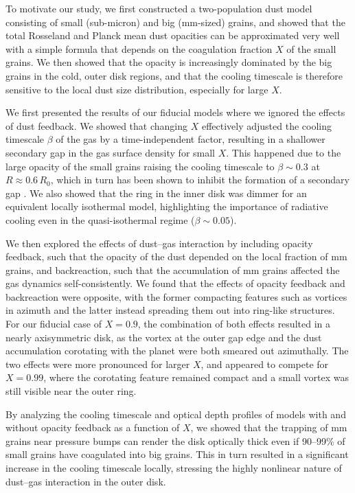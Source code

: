 \documentclass[fleqn,usenatbib,useAMS]{mnras}
\begin{document}
To motivate our study, we first constructed a two-population dust model consisting of small (sub-micron) and big (mm-sized) grains, and showed that the total Rosseland and Planck mean dust opacities can be approximated very well with a simple formula that depends on the coagulation fraction $X$ of the small grains. We then showed that the opacity is increasingly dominated by the big grains in the cold, outer disk regions, and that the cooling timescale is therefore sensitive to the local dust size distribution, especially for large $X$.

We first presented the results of our fiducial models where we ignored the effects of dust feedback. We showed that changing $X$ effectively adjusted the cooling timescale $\beta$ of the gas by a time-independent factor, resulting in a shallower secondary gap in the gas surface density for small $X$. This happened due to the large opacity of the small grains raising the cooling timescale to $\beta\sim0.3$ at $R\approx0.6\,R_0$, which in turn has been shown to inhibit the formation of a secondary gap \citep{miranda-rafikov-2020a,ziampras-etal-2020b,zhang-zhu-2020}. We also showed that the ring in the inner disk was dimmer for an equivalent locally isothermal model, highlighting the importance of radiative cooling even in the quasi-isothermal regime ($\beta\sim0.05$).

We then explored the effects of dust--gas interaction by including opacity feedback, such that the opacity of the dust depended on the local fraction of mm grains, and backreaction, such that the accumulation of mm grains affected the gas dynamics self-consistently. We found that the effects of opacity feedback and backreaction were opposite, with the former compacting features such as vortices in azimuth and the latter instead spreading them out into ring-like structures. For our fiducial case of $X=0.9$, the combination of both effects resulted in a nearly axisymmetric disk, as the vortex at the outer gap edge and the dust accumulation corotating with the planet were both smeared out azimuthally. The two effects were more pronounced for larger $X$, and appeared to compete for $X=0.99$, where the corotating feature remained compact and a small vortex was still visible near the outer ring.

By analyzing the cooling timescale and optical depth profiles of models with and without opacity feedback as a function of $X$, we showed that the trapping of mm grains near pressure bumps can render the disk optically thick even if 90--99\% of small grains have coagulated into big grains. This in turn resulted in a significant increase in the cooling timescale locally, stressing the highly nonlinear nature of dust--gas interaction in the outer disk.
\end{document}
